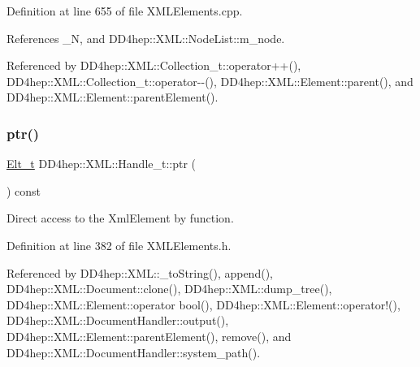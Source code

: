 Definition at line 655 of file X\+M\+L\+Elements.\+cpp.



References \+\_\+N, and D\+D4hep\+::\+X\+M\+L\+::\+Node\+List\+::m\+\_\+node.



Referenced by D\+D4hep\+::\+X\+M\+L\+::\+Collection\+\_\+t\+::operator++(), D\+D4hep\+::\+X\+M\+L\+::\+Collection\+\_\+t\+::operator-\/-\/(), D\+D4hep\+::\+X\+M\+L\+::\+Element\+::parent(), and D\+D4hep\+::\+X\+M\+L\+::\+Element\+::parent\+Element().

\hypertarget{class_d_d4hep_1_1_x_m_l_1_1_handle__t_a7b454a7c9cee6df653be043c17e31cde}{}\label{class_d_d4hep_1_1_x_m_l_1_1_handle__t_a7b454a7c9cee6df653be043c17e31cde} 
\subsubsection{\texorpdfstring{ptr()}{ptr()}}
{\footnotesize\ttfamily \hyperlink{class_d_d4hep_1_1_x_m_l_1_1_handle__t_a81a72155f29971b37652430a334a6b30}{Elt\+\_\+t} D\+D4hep\+::\+X\+M\+L\+::\+Handle\+\_\+t\+::ptr (\begin{DoxyParamCaption}{ }\end{DoxyParamCaption}) const\hspace{0.3cm}{\ttfamily [inline]}}



Direct access to the Xml\+Element by function. 



Definition at line 382 of file X\+M\+L\+Elements.\+h.



Referenced by D\+D4hep\+::\+X\+M\+L\+::\+\_\+to\+String(), append(), D\+D4hep\+::\+X\+M\+L\+::\+Document\+::clone(), D\+D4hep\+::\+X\+M\+L\+::dump\+\_\+tree(), D\+D4hep\+::\+X\+M\+L\+::\+Element\+::operator bool(), D\+D4hep\+::\+X\+M\+L\+::\+Element\+::operator!(), D\+D4hep\+::\+X\+M\+L\+::\+Document\+Handler\+::output(), D\+D4hep\+::\+X\+M\+L\+::\+Element\+::parent\+Element(), remove(), and D\+D4hep\+::\+X\+M\+L\+::\+Document\+Handler\+::system\+\_\+path().

\hypertarget{class_d_d4hep_1_1_x_m_l_1_1_handle__t_ac1ff8abb319ae16ce48262bf012c01be}{}\label{class_d_d4hep_1_1_x_m_l_1_1_handle__t_ac1ff8abb319ae16ce48262bf012c01be} 
